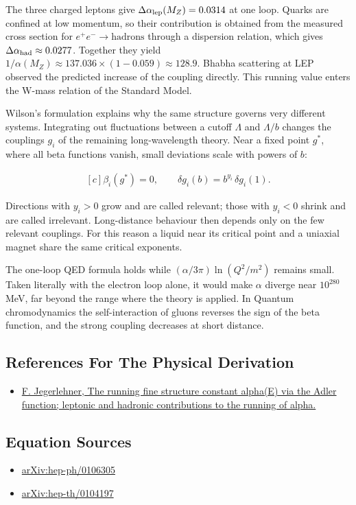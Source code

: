 \documentclass[11pt,oneside]{book}
\newenvironment{centeredalign}{\[\begin{gathered}[c]}{\end{gathered}\]}
\begin{document}
The three charged leptons give \(\Delta\alpha_{\rm lep}(M_Z)=0.0314\) at one loop. Quarks are confined at low momentum, so their contribution is obtained from the measured cross section for \(e^+e^-\to\mathrm{hadrons}\) through a dispersion relation, which gives \(\Delta\alpha_{\rm had}\approx0.0277\). Together they yield \(1/\alpha(M_Z)\approx137.036\times(1-0.059)\approx128.9\). Bhabha scattering at LEP observed the predicted increase of the coupling directly. This running value enters the W-mass relation of the Standard Model.

Wilson's formulation explains why the same structure governs very different systems. Integrating out fluctuations between a cutoff \(\Lambda\) and \(\Lambda/b\) changes the couplings \(g_i\) of the remaining long-wavelength theory. Near a fixed point \(g^*\), where all beta functions vanish, small deviations scale with powers of \(b\):

\begin{centeredalign}
\beta_i(g^*)=0,\qquad \delta g_i(b)=b^{y_i}\,\delta g_i(1).
\end{centeredalign}

Directions with \(y_i>0\) grow and are called relevant; those with \(y_i<0\) shrink and are called irrelevant. Long-distance behaviour then depends only on the few relevant couplings. For this reason a liquid near its critical point and a uniaxial magnet share the same critical exponents.

The one-loop QED formula holds while \((\alpha/3\pi)\ln(Q^2/m^2)\) remains small. Taken literally with the electron loop alone, it would make \(\alpha\) diverge near \(10^{280}\) MeV, far beyond the range where the theory is applied. In Quantum chromodynamics the self-interaction of gluons reverses the sign of the beta function, and the strong coupling decreases at short distance.

\subsection*{References For The Physical Derivation}
\begin{itemize}
\item \href{https://arxiv.org/abs/0807.4206}{F. Jegerlehner, The running fine structure constant alpha(E) via the Adler function; leptonic and hadronic contributions to the running of alpha.}
\end{itemize}



\subsection*{Equation Sources}
\begin{itemize}
\item \href{https://arxiv.org/abs/hep-ph/0106305}{arXiv:hep-ph/0106305}
\item \href{https://arxiv.org/abs/hep-th/0104197}{arXiv:hep-th/0104197}
\end{itemize}
\end{document}
